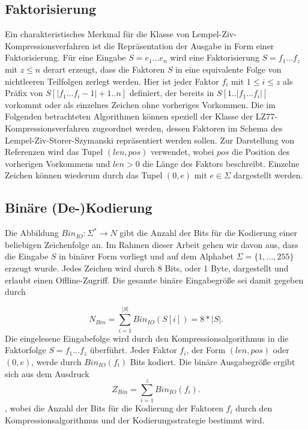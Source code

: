 \subsection{Faktorisierung}
Ein charakteristisches Merkmal für die Klasse von Lempel-Ziv-Kompressionsverfahren ist die Repräsentation der Ausgabe in Form einer Faktorisierung. Für eine Eingabe $S=e_1...e_n$ 
wird eine Faktorisierung $S=f_1...f_z$ mit $z\leq n$ derart erzeugt, dass die Faktoren $S$ in eine equivalente Folge von nichtleeren Teilfolgen zerlegt werden. Hier ist jeder Faktor
$f_i$ mit $1\leq i\leq z$ als Präfix von $S[|f_1...f_i-1|+1..n]$ definiert, der bereits in $S[1..|f_1...f_i|]$ vorkommt oder als einzelnes Zeichen ohne vorheriges Vorkommen. Die im 
Folgenden betrachteten Algorithmen können speziell der Klasse der LZ77-Kompressionsverfahren zugeordnet werden, dessen Faktoren im Schema des Lempel-Ziv-Storer-Szymanski repräsentiert
werden sollen. Zur Darstellung von Referenzen wird das Tupel $(len, pos)$ verwendet, wobei $pos$ die Position des vorherigen Vorkommens und $len>0$ die Länge des Faktors beschreibt. 
Einzelne Zeichen können wiederum durch das Tupel $(0, e)$ mit $e\in \Sigma$ dargestellt werden.

\subsection{Binäre (De-)Kodierung}
Die Abbildung $Bin_{IO}: \Sigma^* \rightarrow N$ gibt die Anzahl der Bits für die Kodierung einer beliebigen Zeichenfolge an. Im Rahmen dieser Arbeit gehen wir davon aus, dass die 
Eingabe $S$ in binärer Form vorliegt und auf dem Alphabet $\Sigma=\{1,...,255\}$ erzeugt wurde. Jedes Zeichen wird durch 8 Bits, oder 1 Byte, dargestellt und erlaubt einen 
Offline-Zugriff. Die gesamte binäre Eingabegröße sei damit gegeben durch 

\begin{equation}
    N_{Bin} = \sum_{i=1}^{|S|} Bin_{IO}(S[i]) = 8*|S|.
\end{equation}
Die eingelesene Eingabefolge wird durch den Kompressionsalgorithmus in die Faktorfolge $S=f_1...f_z$ überführt. Jeder Faktor $f_i$, der Form $(len, pos)$ oder $(0, e)$, werde 
durch $Bin_{IO}(f_i)$ Bits kodiert. Die binäre Ausgabegröße ergibt sich aus dem Ausdruck
\begin{equation}
    Z_{Bin} = \sum_{i=1}^{z} Bin_{IO}(f_i).
\end{equation}
, wobei die Anzahl der Bits für die Kodierung der Faktoren $f_i$ durch den Kompressionsalgorithmus und der Kodierungsstrategie bestimmt wird.

